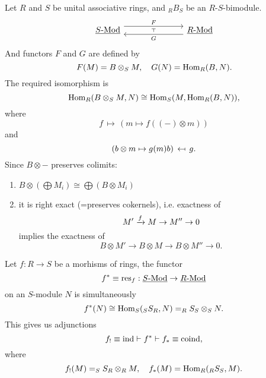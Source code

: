 \begin{examples*}
	\item Let \( R \) and \( S \) be unital associative rings, and \( _R B_S \) be an \( R\text{-}S \)-bimodule.
		\[
			\begin{tikzcd}{\cthyprm{S}{Mod}} &&& {\cthyprm{R}{Mod}}
				\arrow[""{name=0, anchor=center, inner sep=0}, "F", shift left=2, from=1-1, to=1-4]
				\arrow[""{name=1, anchor=center, inner sep=0}, "G", shift left=2, from=1-4, to=1-1]
				\arrow["\adj"{anchor=center, rotate=-90}, draw=none, from=0, to=1]
			\end{tikzcd}
		\]
		And functors \( F \) and \( G \) are defined by
		\[
			F(M) = B \otimes_S M, \quad G(N) = \operatorname{Hom}_R(B, N).
		\]
		The required isomorphism is
		\[
			\operatorname{Hom}_R(B \otimes_S M, N) \cong \operatorname{Hom}_S(M, \operatorname{Hom}_R(B, N)),
		\]
		where
		\[
			f \,\mapsto\, (m \mapsto f((-) \otimes m))
		\]
		and
		\[
			(b \otimes m \mapsto g(m) b) \,\mapsfrom\, g.
		\]
		Since \( B \otimes - \) preserves colimits:
		\begin{enumerate}
			\item \( B \otimes (\bigoplus M_i) \cong \bigoplus (B \otimes M_i) \)
			\item it is right exact (=preserves cokernels), i.e. exactness of
				\[
					M' \xrightarrow{f} M \to M'' \to 0
				\]
				implies the exactness of
				\[
					B \otimes M' \to B \otimes M \to B \otimes M'' \to 0.
				\]
		\end{enumerate}
\end{examples*}

\begin{remark*}
	Let \( f: R \to S \) be a morhisms of rings, the  functor
	\[
		f^* \equiv \operatorname{res}_f: \underline{S\text{-}\mathrm{Mod}} \to \underline{R\text{-}\mathrm{Mod}}
	\]
	on an \( S \)-module \( N \) is simultaneously
	\[
		f^*(N) \cong \operatorname{Hom}_S(_S S_R, N) = _R S_S \otimes_S N.
	\]
	This gives us adjunctions
	\[
		f_! \equiv \operatorname{ind} \mathrel{\vdash} f^* \mathrel{\vdash} f_* \equiv \operatorname{coind},
	\]
	where
	\[
		f_!(M) = _S S_R \otimes_R M, \quad f_*(M) = \operatorname{Hom}_R(_R S_S, M).
	\]
\end{remark*}